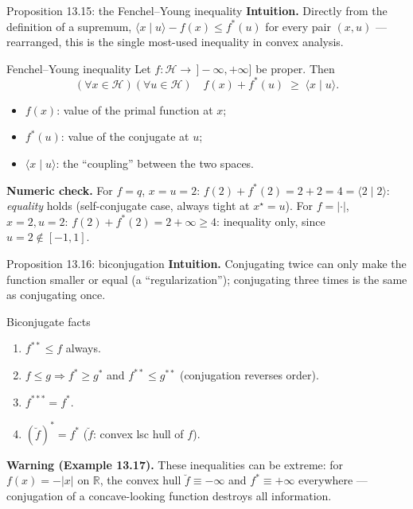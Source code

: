 \documentclass[aspectratio=169,10pt]{beamer}
\newcommand{\R}{\mathbb{R}}
\newcommand{\Hil}{\mathcal{H}}
\newcommand{\inner}[2]{\langle #1 \mid #2 \rangle}
\newcommand{\conj}[1]{#1^{*}}
\newcommand{\biconj}[1]{#1^{**}}
\begin{document}
\begin{frame}{Proposition 13.15: the Fenchel--Young inequality}
  \textbf{Intuition.} Directly from the definition of a supremum,
  $\inner xu - f(x) \le \conj f(u)$ for every pair $(x,u)$ --- rearranged,
  this is the single most-used inequality in convex analysis.
  \begin{block}{Fenchel--Young inequality}
    Let $f:\Hil\to\,]-\infty,+\infty]$ be proper. Then
    \[
      (\forall x\in\Hil)(\forall u\in\Hil)\quad
      f(x) + \conj f(u) \;\ge\; \inner{x}{u}.
      \tag{13.10}
    \]
    \begin{itemize}
      \item $f(x)$: value of the primal function at $x$;
      \item $\conj f(u)$: value of the conjugate at $u$;
      \item $\inner xu$: the ``coupling'' between the two spaces.
    \end{itemize}
  \end{block}
  \textbf{Numeric check.} For $f=q$, $x=u=2$: $f(2)+\conj f(2)=2+2=4=
  \inner22$: \emph{equality} holds (self-conjugate case, always tight at
  $x^\star=u$). For $f=|\cdot|$, $x=2,u=2$: $f(2)+\conj f(2)=2+\infty\ge4$:
  inequality only, since $u=2\notin[-1,1]$.
\end{frame}

\begin{frame}{Proposition 13.16: biconjugation}
  \textbf{Intuition.} Conjugating twice can only make the function smaller
  or equal (a ``regularization''); conjugating three times is the same as
  conjugating once.
  \begin{block}{Biconjugate facts}
    \begin{enumerate}
      \item[(i)] $\biconj f \le f$ always.
      \item[(ii)] $f\le g \Rightarrow \conj f\ge \conj g$ and
        $\biconj f \le \biconj g$ (conjugation reverses order).
      \item[(iii)] $f^{***} = \conj f$.
      \item[(iv)] $\conj{(\breve f)} = \conj f$ ($\breve f$: convex lsc
        hull of $f$).
    \end{enumerate}
  \end{block}
  \textbf{Warning (Example 13.17).} These inequalities can be extreme: for
  $f(x)=-|x|$ on $\R$, the convex hull $\breve f\equiv-\infty$ and
  $\conj f\equiv+\infty$ everywhere --- conjugation of a concave-looking
  function destroys all information.
\end{frame}
\end{document}
